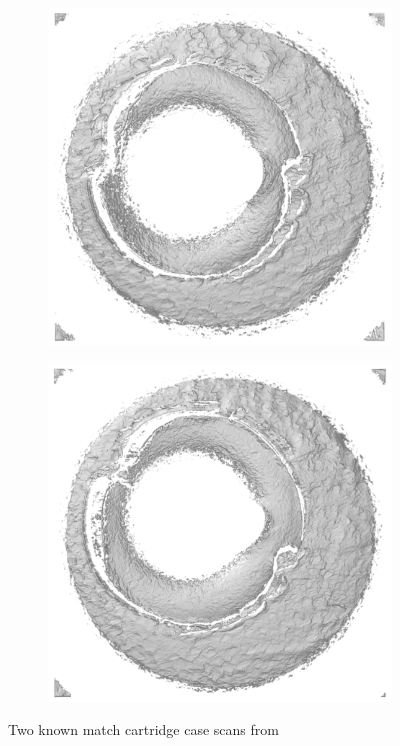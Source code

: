 \begin{figure}[htbp]
\centering
\begin{subfigure}{.49\textwidth}
  \centering
  \includegraphics[width=\linewidth,height = \linewidth]{./images/km1_raw.png}
\end{subfigure}
\begin{subfigure}{.49\textwidth}
  \centering
  \includegraphics[width=\linewidth,height = \linewidth]{./images/km2_raw.png}
\end{subfigure}
\caption{Two known match cartridge case scans from \citet{fadul_empirical_nodate}}
\label{fig:cartridgeCasePair}
\end{figure}

